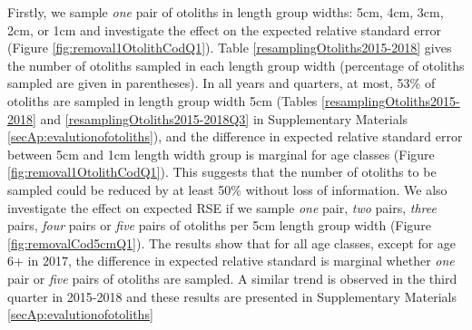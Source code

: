 \documentclass[a4paper 12pt]{article}
\numberwithin{equation}{section}
\begin{document}
Firstly, we sample \textit{one} pair of otoliths in length group widths: 5cm, 4cm, 3cm, 2cm, or 1cm and investigate the effect on the expected relative standard error (Figure \ref{fig:removal1OtolithCodQ1}). Table \ref{resamplingOtoliths2015-2018} gives the number of otoliths sampled in each length group width (percentage of otoliths sampled are given in parentheses). In all years and quarters, at most, 53\% of otoliths are sampled in length group width 5cm (Tables \ref{resamplingOtoliths2015-2018} and \ref{resamplingOtoliths2015-2018Q3} in Supplementary Materials \ref{secAp:evalutionofotoliths}), and the difference in expected relative standard error between 5cm and 1cm length width group is marginal for age classes (Figure \ref{fig:removal1OtolithCodQ1}). This suggests that the number of otoliths to be sampled could be reduced by at least 50\% without loss of information. We also investigate the effect on expected RSE if we sample \textit{one} pair, \textit{two} pairs, \textit{three} pairs, \textit{four} pairs  or \textit{five} pairs of otoliths per 5cm length group width (Figure  \ref{fig:removalCod5cmQ1}). The results show that for all age classes, except for age 6+ in 2017, the difference in expected relative standard is marginal whether \textit{one} pair or \textit{five} pairs of otoliths are sampled. A similar trend is observed in the third quarter in 2015-2018 and these results are presented  in Supplementary Materials \ref{secAp:evalutionofotoliths} \\
\end{document}
